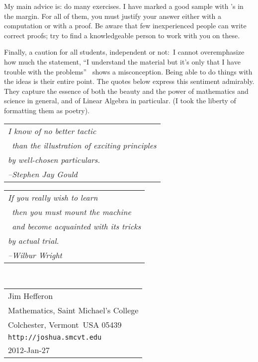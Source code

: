 {My main advice is: do many exercises.
I have marked a good sample with \recommendationmark's in the margin.
For all of them, you must justify your answer either with a computation
or with a proof.
Be aware that few inexperienced people can write correct proofs;
try to find a knowledgeable person to work with you on these.

\bigskip
Finally, a caution for all students, independent or not:~I 
cannot overemphasize how much the 
statement, ``I understand the material but it's only 
that I have trouble with the problems''\ %
shows a misconception.
Being able to do things with the ideas is their entire point.
The quotes below express this sentiment admirably.
They capture the essence of both the beauty and the power
of mathematics and science in general, 
and of Linear Algebra in particular.
(I took the liberty of formatting them as poetry).

\bigskip
\par\noindent\begin{tabular}[t]{@{}l@{}}
  \textit{I know of no better tactic}                     \\
  \textit{\ than the illustration of exciting principles} \\
  \textit{by well-chosen particulars.}                    \\
  \hspace*{1in}\textit{--Stephen Jay Gould}
\end{tabular}

\bigskip
\par\noindent
\begin{tabular}[t]{@{}l@{}}   
\textit{If you really wish to learn}                     \\
   \textit{\ then you must mount the machine}  \\ 
   \textit{\ and become acquainted with its tricks} \\
   \textit{by actual trial.}                    \\
   \hspace*{1in}\textit{--Wilbur Wright}
\end{tabular}

\par\ \hfill\begin{tabular}[t]{@{}l@{}}
                       Jim Hef{}feron            \\
                       Mathematics, Saint Michael's College \\ 
                       Colchester, Vermont\ USA 05439  \\     
                       \texttt{http://joshua.smcvt.edu} \\
                       2012-Jan-27
                    \end{tabular}

}
